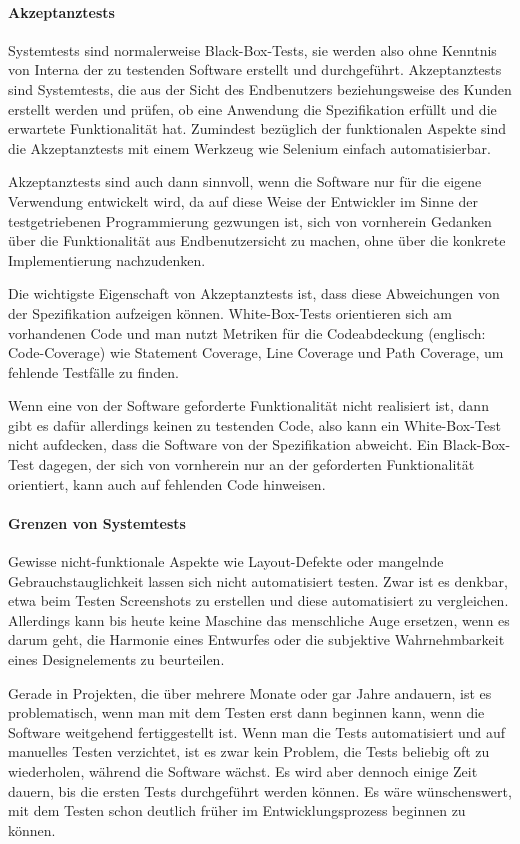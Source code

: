 \paragraph{Akzeptanztests}
Systemtests sind normalerweise Black-Box-Tests, sie werden also ohne Kenntnis von Interna der zu testenden Software erstellt und durchgeführt. Akzeptanztests sind Systemtests, die aus der Sicht des Endbenutzers beziehungsweise des Kunden erstellt werden und prüfen, ob eine Anwendung die Spezifikation erfüllt und die erwartete Funktionalität hat. Zumindest bezüglich der funktionalen Aspekte sind die Akzeptanztests mit einem Werkzeug wie Selenium einfach automatisierbar. 

Akzeptanztests sind auch dann sinnvoll, wenn die Software nur für die eigene Verwendung entwickelt wird, da auf diese Weise der Entwickler im Sinne der testgetriebenen Programmierung gezwungen ist, sich von vornherein Gedanken über die Funktionalität aus Endbenutzersicht zu machen, ohne über die konkrete Implementierung nachzudenken.

Die wichtigste Eigenschaft von Akzeptanztests ist, dass diese Abweichungen von der Spezifikation aufzeigen können. White-Box-Tests orientieren sich am vorhandenen Code und man nutzt Metriken für die Codeabdeckung (englisch: Code-Coverage) wie Statement Coverage, Line Coverage und Path Coverage, um fehlende Testfälle zu finden. 

Wenn eine von der Software geforderte Funktionalität nicht realisiert ist, dann gibt es dafür allerdings keinen zu testenden Code, also kann ein White-Box-Test nicht aufdecken, dass die Software
von der Spezifikation abweicht. Ein Black-Box-Test dagegen, der sich von vornherein nur
an der geforderten Funktionalität orientiert, kann auch auf fehlenden Code hinweisen.

\paragraph{Grenzen von Systemtests}
Gewisse nicht-funktionale Aspekte wie Layout-Defekte oder mangelnde Gebrauchstauglichkeit lassen sich nicht automatisiert testen. Zwar ist es denkbar, etwa beim Testen Screenshots zu erstellen und diese automatisiert zu vergleichen. Allerdings kann bis heute keine Maschine das menschliche Auge ersetzen, wenn es darum geht, die Harmonie eines Entwurfes oder die subjektive Wahrnehmbarkeit eines Designelements zu beurteilen.

Gerade in Projekten, die über mehrere Monate oder gar Jahre andauern, ist es problematisch,
wenn man mit dem Testen erst dann beginnen kann, wenn die Software weitgehend fertiggestellt ist. Wenn man die Tests automatisiert und auf manuelles Testen verzichtet, ist es zwar kein Problem, die Tests beliebig oft zu wiederholen, während die Software wächst. Es wird aber dennoch einige Zeit dauern, bis die ersten Tests durchgeführt werden können. Es wäre wünschenswert, mit dem Testen schon deutlich früher im Entwicklungsprozess beginnen zu können.

